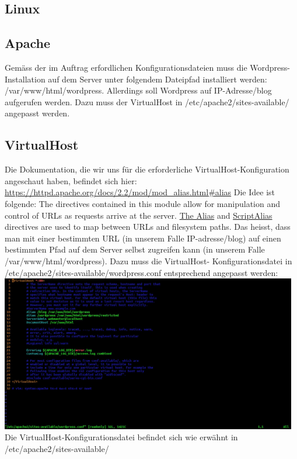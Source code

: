 \documentclass{article}
\begin{document}
	\subsection{Linux}
	\subsection{Apache}
	Gemäss der im Auftrag erfordlichen Konfigurationsdateien muss die Wordpress-Installation auf dem Server unter folgendem Dateipfad installiert werden: /var/www/html/wordpress.
	Allerdings soll Wordpress auf IP-Adresse/blog aufgerufen werden. Dazu muss der VirtualHost in /etc/apache2/sites-available/ angepasst werden.
	\subsection{VirtualHost}
	Die Dokumentation, die wir uns für die erforderliche VirtualHost-Konfiguration angeschaut haben, befindet sich hier: \url{https://httpd.apache.org/docs/2.2/mod/mod_alias.html\#alias}
	Die Idee ist folgende:
	The directives contained in this module allow for manipulation and control of URLs as requests arrive at the server. \underline{The Alias} and \underline{ScriptAlias} directives are used to map between URLs and filesystem paths.
	Das heisst, dass man mit einer bestimmten URL (in unserem Falle IP-adresse/blog) auf einen bestimmten Pfad auf dem Server selbst zugreifen kann (in unserem Falle /var/www/html/wordpress). Dazu muss die VirtualHost- Konfigurationsdatei in /etc/apache2/sites-available/wordpress.conf entsprechend angepasst werden:
	\newline
	\newline
	\includegraphics[width=13cm]{../Pics/wordpress}
	\newline
	\newline
	Die VirtualHost-Konfigurationsdatei befindet sich wie erwähnt in /etc/apache2/sites-available/
\end{document}

